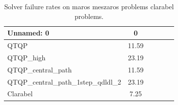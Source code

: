 \begin{table}
\caption{Solver failure rates on maros meszaros problems clarabel problems.}
\label{t-maros meszaros problems clarabel-failure}
\begin{tabular}{lccccc}
\toprule
Unnamed: 0 & 0 \\
\midrule
QTQP & 11.59 \\
QTQP_high & 23.19 \\
QTQP_central_path & 11.59 \\
QTQP_central_path_1step_qdldl_2 & 23.19 \\
Clarabel & 7.25 \\
\bottomrule
\end{tabular}
\end{table}
